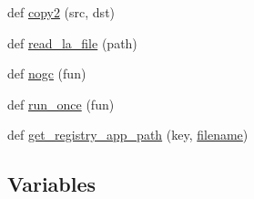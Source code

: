 \begin{DoxyCompactItemize}
def \hyperlink{namespacewaflib_1_1_utils_aee572b4c10efd729fd5e3408c79c3923}{copy2} (src, dst)
\item 
def \hyperlink{namespacewaflib_1_1_utils_a4e2ef7a36fd70943a5179f154b353fa4}{read\+\_\+la\+\_\+file} (path)
\item 
def \hyperlink{namespacewaflib_1_1_utils_aecd76698a5ada6c82e0a4efbe332b225}{nogc} (fun)
\item 
def \hyperlink{namespacewaflib_1_1_utils_acdbff8b85a82ea90066870d7f6344ea7}{run\+\_\+once} (fun)
\item 
def \hyperlink{namespacewaflib_1_1_utils_a337abeed4baef3a80d2fc8f3ec0044db}{get\+\_\+registry\+\_\+app\+\_\+path} (key, \hyperlink{test__portburn_8cpp_a7efa5e9c7494c7d4586359300221aa5d}{filename})
\end{DoxyCompactItemize}
\subsection*{Variables}
